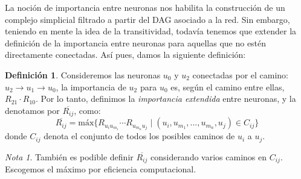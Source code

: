 \documentclass[12pt, a4paper, twoside]{book}
\numberwithin{equation}{section}
\theoremstyle{definition}
\newtheorem{defi}{Definición}
\theoremstyle{remark}
\newtheorem*{remark}{Nota}
\theoremstyle{plain}
\begin{document}
	La noción de importancia entre neuronas nos habilita la construcción 
	de un complejo simplicial filtrado a partir del DAG asociado a la red. 
	Sin embargo, teniendo en mente la idea de la transitividad, todavía 
	tenemos que extender la definición de la importancia entre neuronas 
	para aquellas que no estén directamente conectadas. Así pues, damos la 
	siguiente definición: 
	\begin{defi}
	Consideremos las neuronas $u_{0}$ y $u_{2}$ conectadas por el camino: 
	$u_{2} 
	\rightarrow u_{1} \rightarrow u_{0}$, la importancia de $u_{2}$ para 
	$u_{0}$ es, según el camino entre ellas, $R_{21} \cdot R_{10}$.
	Por lo tanto, definimos la \textit{importancia extendida} entre 
	neuronas, y la denotamos por $\overline{R_{ij}}$, como:
	\begin{equation}
		\overline{R_{ij}}=\text{máx}\{R_{u_{i}u_{m_{1}}} \cdots
		R_{u_{m_{n}}u_{j}} \mid (u_{i},u_{m_{1}},...,u_{m_{n}},u_{j}) 
	\in C_{ij} \}
		\label{def:ie}
	\end{equation}	
	donde $C_{ij}$ denota el conjunto de todos los posibles caminos de 
	$u_{i}$ a $u_{j}$. 
	\end{defi}

	\begin{remark}
	También es podible definir $\overline{R_{ij}}$ considerando varios 
	caminos en $C_{ij}$. Escogemos el máximo por eficiencia computacional.
	\end{remark}
\end{document}

